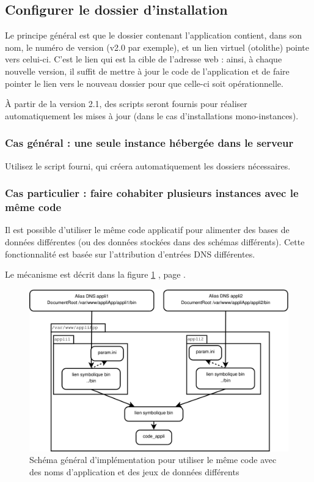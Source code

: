 \subsection{Configurer le dossier d'installation}

Le principe général est que le dossier contenant l'application contient, dans son nom, le numéro de version (v2.0 par exemple), et un lien virtuel (otolithe) pointe vers celui-ci. C'est le lien qui est la cible de l'adresse web : ainsi, à chaque nouvelle version, il suffit de mettre à jour le code de l'application et de faire pointer le lien vers le nouveau dossier pour que celle-ci soit opérationnelle.

À partir de la version 2.1, des scripts seront fournis pour réaliser automatiquement les mises à jour (dans le cas d'installations mono-instances).

\subsubsection{Cas général : une seule instance hébergée dans le serveur}

Utilisez le script fourni, qui créera automatiquement les dossiers nécessaires. 


\subsubsection{Cas particulier : faire cohabiter plusieurs instances avec le même code}
\label{dnsmultiple}
Il est possible d'utiliser le même code applicatif pour alimenter des bases de données différentes (ou des données stockées dans des schémas différents). Cette fonctionnalité est basée sur l'attribution d'entrées DNS différentes. 

Le mécanisme est décrit dans la figure \ref{dnsmultipleschema} \textit{}, page \pageref{dnsmultipleschema}.

\begin{figure}[H]
\includegraphics[width=\linewidth]{images/dnsmultiple}
\caption{\label{dnsmultipleschema}Schéma général d’implémentation pour utiliser le même code avec des noms d’application et des jeux de données différents}
\end{figure}


